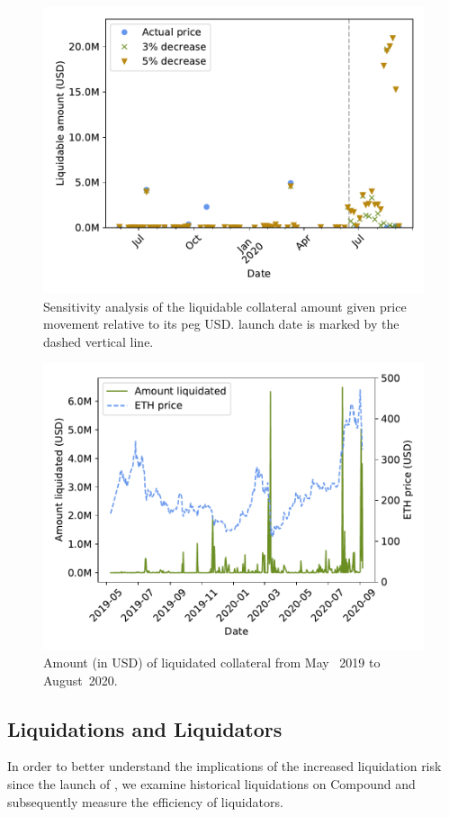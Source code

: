 \begin{figure}[tb]
  \centering
  \includegraphics[width=.7\textwidth]{./6-application-security/figures/dai-sensitivity.pdf}
  \caption{Sensitivity analysis of the liquidable collateral amount given  price movement relative to its peg USD.  launch date is marked by the dashed vertical line.}
  \label{fig:price-sensitivity}
\end{figure}

\begin{figure}[tb]
  \centering
  \includegraphics[width=.7\textwidth]{./6-application-security/figures/liquidation-over-time.pdf}
  \caption{Amount (in USD) of liquidated collateral from May ~2019 to August~2020.}
  \label{fig:liquidations-over-time}
\end{figure}

\subsection{Liquidations and Liquidators}
In order to better understand the implications of the increased liquidation risk since the launch of , we examine historical liquidations on Compound and subsequently measure the efficiency of liquidators.

